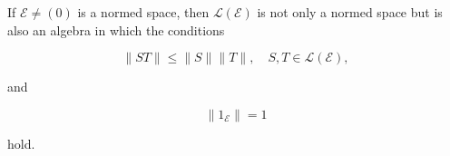 If $\mathcal{E} \neq (0)$ is a normed space, then $\mathcal{L}(\mathcal{E})$ is not only a normed space but is also an algebra in which the conditions

$$\| ST \| \leq \| S \| \| T \|, \quad S, T \in \mathcal{L}(\mathcal{E}),$$

and

$$\| 1_{\mathcal{E}} \| = 1$$

hold.
